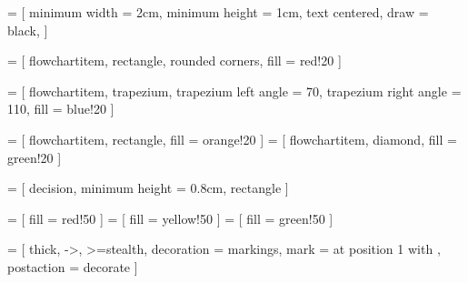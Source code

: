 \usepackage{tikz}
\usepackage{tkz-euclide}
\usetikzlibrary{shapes.geometric, arrows}
\usepackage{tikz-qtree}


 = [
	minimum width = 2cm,
	minimum height = 1cm,
	text centered,
	draw = black,
]

 = [
	flowchartitem,
	rectangle,
	rounded corners,
	fill = red!20
]
 
 = [
	flowchartitem,
	trapezium,
	trapezium left angle = 70,
	trapezium right angle = 110,
	fill = blue!20
]

 = [
	flowchartitem,
	rectangle,
	fill = orange!20
]
 = [
	flowchartitem,
	diamond,
	fill = green!20
]

 = [
	decision,
	minimum height = 0.8cm,
	rectangle
]

 = [ fill = red!50 ]
 = [ fill = yellow!50 ]
 = [ fill = green!50 ]

\newenvironment*{tikzfigure}[1][]{
	\begin{figure}[h!]
	\begin{tikzfigureinternal}[#1]
}{
	\end{tikzfigureinternal}
	\end{figure}
}

\newenvironment*{tikzsubfigure}[1][]{
	\begin{subfigure}[b]{0.45\textwidth}
	\begin{tikzfigureinternal}[#1]
}{
	\end{tikzfigureinternal}
	\end{subfigure}
}

\newenvironment*{tikzfigureinternal}[1][]{
	\centering
	\gdef\tcapt{#1}
	\begin{tikzpicture}[scale=1]
}{
	\end{tikzpicture}
	\caption{\tcapt}
}

 = [
	thick,
	->,
	>=stealth,
	decoration = {
		markings,
		mark = at position 1 with {
			\arrow[scale=2]{>}
		}
	},
	postaction = {decorate}
]

\newenvironment*{flowchart}[2]{
	\label{#1}
	\begin{tikzfigure}[#2]
	\tikzset {
		level distance = 3cm,
		grow = down,
		edge from parent/.append style = { flowchartArrow }
	}
}{
	\end{tikzfigure}
}
